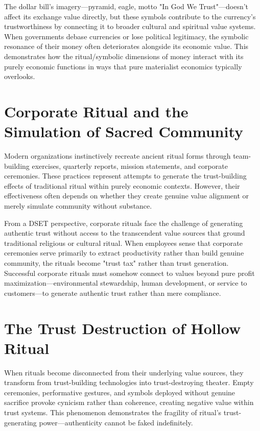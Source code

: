 \documentclass[11pt,oneside]{book}
\begin{document}
The dollar bill's imagery—pyramid, eagle, motto "In God We Trust"—doesn't affect its exchange value directly, but these symbols contribute to the currency's trustworthiness by connecting it to broader cultural and spiritual value systems. When governments debase currencies or lose political legitimacy, the symbolic resonance of their money often deteriorates alongside its economic value. This demonstrates how the ritual/symbolic dimensions of money interact with its purely economic functions in ways that pure materialist economics typically overlooks.
\section{Corporate Ritual and the Simulation of Sacred Community}

Modern organizations instinctively recreate ancient ritual forms through team-building exercises, quarterly reports, mission statements, and corporate ceremonies. These practices represent attempts to generate the trust-building effects of traditional ritual within purely economic contexts. However, their effectiveness often depends on whether they create genuine value alignment or merely simulate community without substance.

From a DSET perspective, corporate rituals face the challenge of generating authentic trust without access to the transcendent value sources that ground traditional religious or cultural ritual. When employees sense that corporate ceremonies serve primarily to extract productivity rather than build genuine community, the rituals become "trust tax" rather than trust generation. Successful corporate rituals must somehow connect to values beyond pure profit maximization—environmental stewardship, human development, or service to customers—to generate authentic trust rather than mere compliance.

\section{The Trust Destruction of Hollow Ritual}

When rituals become disconnected from their underlying value sources, they transform from trust-building technologies into trust-destroying theater. Empty ceremonies, performative gestures, and symbols deployed without genuine sacrifice provoke cynicism rather than coherence, creating negative value within trust systems. This phenomenon demonstrates the fragility of ritual's trust-generating power—authenticity cannot be faked indefinitely.
\end{document}
